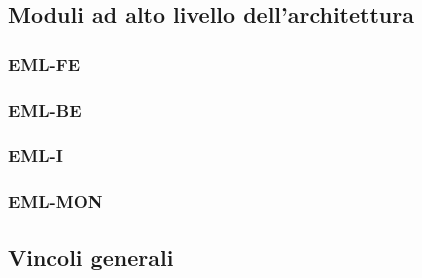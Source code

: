 \subsection{Moduli ad alto livello dell'architettura}
\subsubsection{EML-FE}
\subsubsection{EML-BE}
\subsubsection{EML-I}
\subsubsection{EML-MON}
\subsection{Vincoli generali}